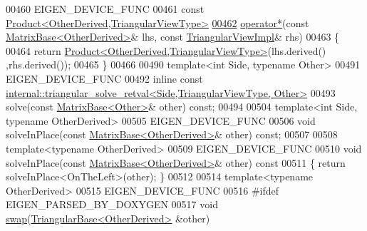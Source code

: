 \begin{DoxyCode}
00460     EIGEN\_DEVICE\_FUNC
00461     \textcolor{keyword}{const} \hyperlink{group___core___module_class_eigen_1_1_product}{Product<OtherDerived,TriangularViewType>}
\hyperlink{group___core___module_a74022a74c156ec81e2e06d8f077e0eff}{00462}     \hyperlink{group___core___module_a74022a74c156ec81e2e06d8f077e0eff}{operator*}(\textcolor{keyword}{const} \hyperlink{group___core___module_class_eigen_1_1_matrix_base}{MatrixBase<OtherDerived>}& lhs, \textcolor{keyword}{const} 
      \hyperlink{class_eigen_1_1_triangular_view_impl}{TriangularViewImpl}& rhs)
00463     \{
00464       \textcolor{keywordflow}{return} \hyperlink{group___core___module_class_eigen_1_1_product}{Product<OtherDerived,TriangularViewType>}(lhs.derived()
      ,rhs.derived());
00465     \}
00466 
00490     \textcolor{keyword}{template}<\textcolor{keywordtype}{int} S\textcolor{keywordtype}{id}e, \textcolor{keyword}{typename} Other>
00491     EIGEN\_DEVICE\_FUNC
00492     \textcolor{keyword}{inline} \textcolor{keyword}{const} 
      \hyperlink{struct_eigen_1_1internal_1_1triangular__solve__retval}{internal::triangular\_solve\_retval<Side,TriangularViewType, Other>}
00493     solve(\textcolor{keyword}{const} \hyperlink{group___core___module_class_eigen_1_1_matrix_base}{MatrixBase<Other>}& other) \textcolor{keyword}{const};
00494 
00504     \textcolor{keyword}{template}<\textcolor{keywordtype}{int} S\textcolor{keywordtype}{id}e, \textcolor{keyword}{typename} OtherDerived>
00505     EIGEN\_DEVICE\_FUNC
00506     \textcolor{keywordtype}{void} solveInPlace(\textcolor{keyword}{const} \hyperlink{group___core___module_class_eigen_1_1_matrix_base}{MatrixBase<OtherDerived>}& other) \textcolor{keyword}{const};
00507 
00508     \textcolor{keyword}{template}<\textcolor{keyword}{typename} OtherDerived>
00509     EIGEN\_DEVICE\_FUNC
00510     \textcolor{keywordtype}{void} solveInPlace(\textcolor{keyword}{const} \hyperlink{group___core___module_class_eigen_1_1_matrix_base}{MatrixBase<OtherDerived>}& other)\textcolor{keyword}{ const}
00511 \textcolor{keyword}{    }\{ \textcolor{keywordflow}{return} solveInPlace<OnTheLeft>(other); \}
00512 
00514     \textcolor{keyword}{template}<\textcolor{keyword}{typename} OtherDerived>
00515     EIGEN\_DEVICE\_FUNC
00516 \textcolor{preprocessor}{#ifdef EIGEN\_PARSED\_BY\_DOXYGEN}
00517     \textcolor{keywordtype}{void} \hyperlink{endian_8c_a3ca5ecd34b04d6a243c054ac3a57f68d}{swap}(\hyperlink{group___core___module_class_eigen_1_1_triangular_base}{TriangularBase<OtherDerived>} &other)

\end{DoxyCode}
